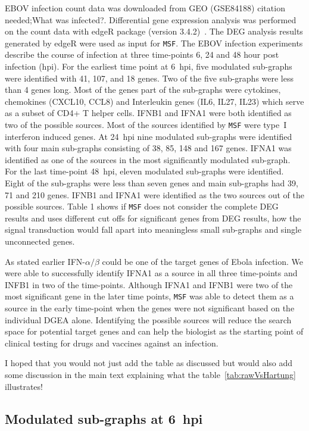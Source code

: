 \documentclass[10pt,a4paper,twocolumn]{article}
\newcommand{\TODO}[1]{\begingroup\color{red}#1\endgroup}
\begin{document}
EBOV infection count data was downloaded from GEO (GSE84188)
\TODO{citation needed};\TODO{What was infected?}. Differential gene
expression analysis was performed on the count data with edgeR package
(version 3.4.2)~\cite{edgeR}. The DEG analysis results generated by
edgeR were used as input for \texttt{MSF}. The EBOV infection
experiments describe the course of infection at three time-points 6,
24 and 48 hour post infection (hpi). For the earliest time point at
6~hpi, five modulated sub-graphs were identified with 41, 107, and 18
genes. Two of the five sub-graphs were less than 4 genes long. Most of
the genes part of the sub-graphs were cytokines, chemokines (CXCL10,
CCL8) and Interleukin genes (IL6, IL27, IL23) which serve as a subset
of CD4+ T helper cells. IFNB1 and IFNA1 were both identified as two of
the possible sources. Most of the sources identified by \texttt{MSF}
were type~I interferon induced genes. At 24~hpi nine modulated
sub-graphs were identified with four main sub-graphs consisting of 38,
85, 148 and 167 genes. IFNA1 was identified as one of the sources in
the most significantly modulated sub-graph. For the last time-point
48~hpi, eleven modulated sub-graphs were identified. Eight of the
sub-graphs were less than seven genes and main sub-graphs had 39, 71
and 210 genes. IFNB1 and IFNA1 were identified as the two sources out
of the possible sources. Table 1 shows if \texttt{MSF} does not
consider the complete DEG results and uses different cut offs for
significant genes from DEG results, how the signal transduction would
fall apart into meaningless small sub-graphs and single unconnected
genes.

As stated earlier IFN-$\alpha / \beta$ could be one of the target
genes of Ebola infection. We were able to successfully identify IFNA1
as a source in all three time-points and INFB1 in two of the
time-points. Although IFNA1 and IFNB1 were two of the most significant
gene in the later time points, \texttt{MSF} was able to detect them as
a source in the early time-point when the genes were not significant
based on the individual DGEA alone. Identifying the possible sources
will reduce the search space for potential target genes and can help
the biologist as the starting point of clinical testing for drugs and
vaccines against an infection.

\TODO{I hoped that you would not just add the table as discussed but
  would also add some discussion in the main text explaining what the
  table~\ref{tab:rawVsHartung} illustrates!}


\subsection*{Modulated sub-graphs at 6~hpi}
\end{document}
